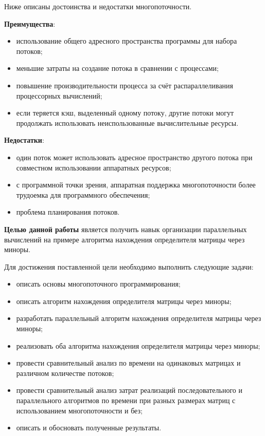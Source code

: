Ниже описаны достоинства и недостатки многопоточности.

\textbf{Преимущества}:
\begin{itemize}[label=---]
	\item использование общего адресного пространства программы для набора потоков;
    \item меньшие затраты на создание потока в сравнении с процессами;
    \item повышение производительности процесса за счёт распараллеливания процессорных вычислений;
    \item если теряется кэш, выделенный одному потоку, другие потоки могут продолжать использовать неиспользованные вычислительные ресурсы.
\end{itemize}

\textbf{Недостатки}:
\begin{itemize}[label=---]
	\item один поток может использовать адресное пространство другого потока при совместном использовании аппаратных ресурсов;
    \item с программной точки зрения, аппаратная поддержка многопоточности более трудоемка для программного обеспечения;
    \item проблема планирования потоков.
\end{itemize}

\textbf{Целью данной работы} является получить навык организации параллельных вычислений на примере алгоритма нахождения определителя матрицы через миноры.

Для достижения поставленной цели необходимо выполнить следующие задачи:
\begin{itemize}[label=---]
	\item описать основы многопоточного программирования;
    \item описать алгоритм нахождения определителя матрицы через миноры;
    \item разработать параллельный алгоритм нахождения определителя матрицы через миноры;
    \item реализовать оба алгоритма нахождения определителя матрицы через миноры;
    \item провести сравнительный анализ по времени на одинаковых матрицах и различном количестве потоков;
    \item провести сравнительный анализ затрат реализаций последовательного и параллельного алгоритмов по времени при разных размерах матриц с использованием многопоточности и без;
	\item описать и обосновать полученные результаты.
\end{itemize}